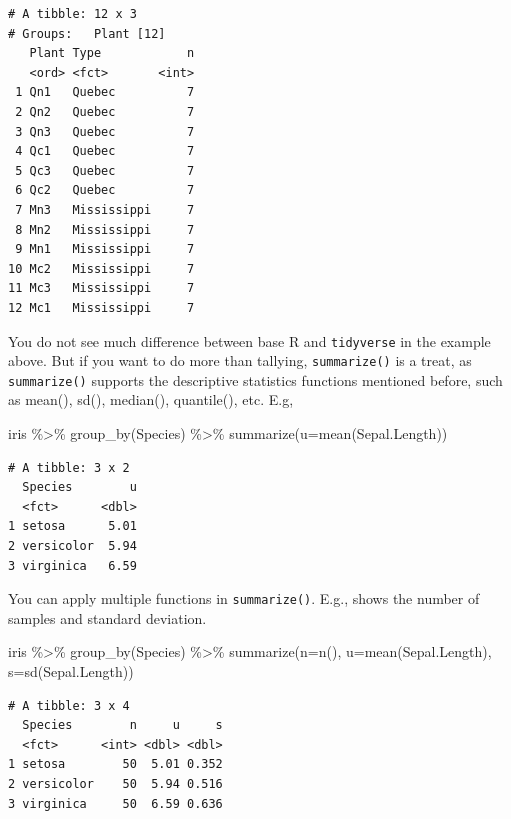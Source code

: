 \documentclass[
  letterpaper,
]{book}
\newenvironment{Shaded}{\begin{snugshade}}{\end{snugshade}}
\newcommand{\AttributeTok}[1]{\textcolor[rgb]{0.40,0.45,0.13}{#1}}
\newcommand{\FunctionTok}[1]{\textcolor[rgb]{0.28,0.35,0.67}{#1}}
\newcommand{\NormalTok}[1]{\textcolor[rgb]{0.00,0.23,0.31}{#1}}
\newcommand{\SpecialCharTok}[1]{\textcolor[rgb]{0.37,0.37,0.37}{#1}}
\begin{document}
\begin{verbatim}
# A tibble: 12 x 3
# Groups:   Plant [12]
   Plant Type            n
   <ord> <fct>       <int>
 1 Qn1   Quebec          7
 2 Qn2   Quebec          7
 3 Qn3   Quebec          7
 4 Qc1   Quebec          7
 5 Qc3   Quebec          7
 6 Qc2   Quebec          7
 7 Mn3   Mississippi     7
 8 Mn2   Mississippi     7
 9 Mn1   Mississippi     7
10 Mc2   Mississippi     7
11 Mc3   Mississippi     7
12 Mc1   Mississippi     7
\end{verbatim}

You do not see much difference between base R and \texttt{tidyverse} in
the example above. But if you want to do more than tallying,
\texttt{summarize()} is a treat, as \texttt{summarize()} supports the
descriptive statistics functions mentioned before, such as mean(), sd(),
median(), quantile(), etc. E.g,

\begin{Shaded}
\begin{Highlighting}[]
\NormalTok{iris }\SpecialCharTok{\%\textgreater{}\%}
  \FunctionTok{group\_by}\NormalTok{(Species) }\SpecialCharTok{\%\textgreater{}\%}
  \FunctionTok{summarize}\NormalTok{(}\AttributeTok{u=}\FunctionTok{mean}\NormalTok{(Sepal.Length))}
\end{Highlighting}
\end{Shaded}

\begin{verbatim}
# A tibble: 3 x 2
  Species        u
  <fct>      <dbl>
1 setosa      5.01
2 versicolor  5.94
3 virginica   6.59
\end{verbatim}

You can apply multiple functions in \texttt{summarize()}. E.g., shows
the number of samples and standard deviation.

\begin{Shaded}
\begin{Highlighting}[]
\NormalTok{iris }\SpecialCharTok{\%\textgreater{}\%}
  \FunctionTok{group\_by}\NormalTok{(Species) }\SpecialCharTok{\%\textgreater{}\%}
  \FunctionTok{summarize}\NormalTok{(}\AttributeTok{n=}\FunctionTok{n}\NormalTok{(),}
            \AttributeTok{u=}\FunctionTok{mean}\NormalTok{(Sepal.Length),}
            \AttributeTok{s=}\FunctionTok{sd}\NormalTok{(Sepal.Length))}
\end{Highlighting}
\end{Shaded}

\begin{verbatim}
# A tibble: 3 x 4
  Species        n     u     s
  <fct>      <int> <dbl> <dbl>
1 setosa        50  5.01 0.352
2 versicolor    50  5.94 0.516
3 virginica     50  6.59 0.636
\end{verbatim}
\end{document}
